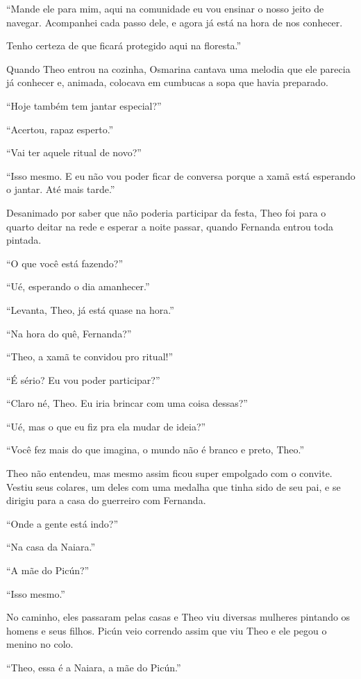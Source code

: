 ``Mande ele para mim, aqui na comunidade eu vou ensinar o nosso jeito de
navegar. Acompanhei cada passo dele, e agora já está na hora de
nos conhecer.

Tenho certeza de que ficará protegido aqui na floresta.''

\asterisc

Quando Theo entrou na cozinha, Osmarina cantava uma melodia que ele
parecia já conhecer e, animada, colocava em cumbucas a sopa que havia
preparado.

``Hoje também tem jantar especial?''

``Acertou, rapaz esperto.''

``Vai ter aquele ritual de novo?''

``Isso mesmo. E eu não vou poder ficar de conversa porque a xamã está
esperando o jantar. Até mais tarde.''

Desanimado por saber que não poderia participar da festa, Theo foi para
o quarto deitar na rede e esperar a noite passar, quando Fernanda entrou
toda pintada.

``O que você está fazendo?''

``Ué, esperando o dia amanhecer.''

``Levanta, Theo, já está quase na hora.''

``Na hora do quê, Fernanda?''

``Theo, a xamã te convidou pro ritual!''

``É sério? Eu vou poder participar?''

``Claro né, Theo. Eu iria brincar com uma coisa dessas?''

``Ué, mas o que eu fiz pra ela mudar de ideia?''

``Você fez mais do que imagina, o mundo não é branco e preto, Theo.''

Theo não entendeu, mas mesmo assim ficou super empolgado com o convite.
Vestiu seus colares, um deles com uma medalha que tinha sido de seu pai,
e se dirigiu para a casa do guerreiro com Fernanda.

``Onde a gente está indo?''

``Na casa da Naiara.''

``A mãe do Picún?''

``Isso mesmo.''

No caminho, eles passaram pelas casas e Theo viu diversas mulheres
pintando os homens e seus filhos. Picún veio correndo assim que viu Theo
e ele pegou o menino no colo.

``Theo, essa é a Naiara, a mãe do Picún.''

